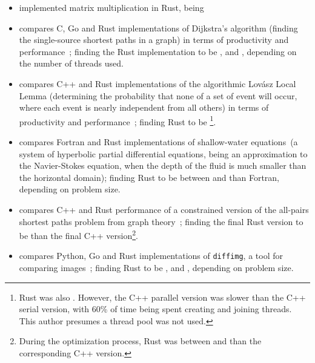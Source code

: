 \documentclass[british]{scrreprt}
\begin{document}
\begin{itemize}
	\item {} implemented matrix multiplication in Rust, being ~\cite{Sverdrupgemmrabbithole2016, Sverdrupblussmatrixmultiply2020}
	\item {} compares C, Go and Rust implementations of Dijkstra's algorithm (finding the single-source shortest paths in a graph) in terms of productivity and performance~\cite{WilkensEvaluationperformanceproductivity2015}; finding the Rust implementation to be , and , depending on the number of threads used.
	\item \citeauthor{PerezRustperformanceAlgorithmic2017} compares C++ and Rust implementations of the algorithmic Lovász Local Lemma (determining the probability that none of a set of event will occur, where each event is nearly independent from all others) in terms of productivity and performance~\cite{PerezRustperformanceAlgorithmic2017}; finding Rust to be \footnote{Rust was also . However, the C++ parallel version was slower than the C++ serial version, with 60\% of time being spent creating and joining threads. This author presumes a thread pool was not used.}. %
	\item {} compares Fortran and Rust implementations of shallow-water equations~\cite{McKeoghRewritingFORTRANSoftware2020}(a system of hyperbolic partial differential equations, being an approximation to the Navier-Stokes equation, when the depth of the fluid is much smaller than the horizontal domain); finding Rust to be between  and  than Fortran, depending on problem size. %
	\item {} compares C++ and Rust performance of a constrained version of the all-pairs shortest paths problem from graph theory~\cite{LindgrenComparingparallelRust2020}; finding the final Rust version to be  than the final C++ version\footnote{During the optimization process, Rust was between  and  than the corresponding C++ version.}.
	\item {} compares Python, Go and Rust implementations of \texttt{diffimg}, a tool for comparing images~\cite{HahnOneProgramWritten2019}; finding Rust to be , and , depending on problem size.

\end{itemize}
\end{document}
